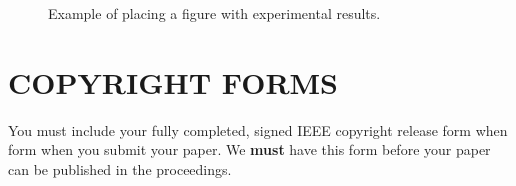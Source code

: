 \documentclass{article}
\begin{document}
\begin{figure}[htb]
%
\caption{Example of placing a figure with experimental results.}
\label{fig:res}
%
\end{figure}



\section{COPYRIGHT FORMS}
\label{sec:copyright}

You must include your fully completed, signed IEEE copyright release form when
form when you submit your paper. We {\bf must} have this form before your paper
can be published in the proceedings.



\end{document}
